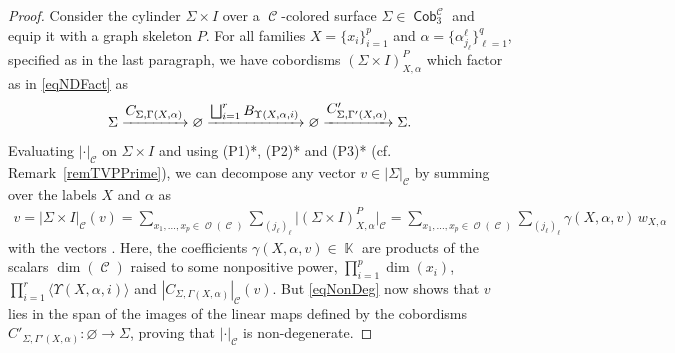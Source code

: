 \documentclass[pdftex]{sigma}
\DeclareMathOperator{\K}{\mathbb{K}}
\DeclareMathOperator{\Cob}{\mathsf{Cob}}
\DeclareMathOperator{\calc}{\mathcal{C}}
\DeclareMathOperator{\calo}{\mathcal{O}}
\numberwithin{equation}{section}
\theoremstyle{definition}
\begin{document}
\begin{proof}
 Consider the cylinder $\Sigma \times I$ over a $\calc$-colored surface $\Sigma \in \Cob_3^{\calc}$ and equip it with a graph skeleton $P$.
 For all families $X = \{x_i\}_{i = 1}^p$ and $\alpha = \{\alpha_{j_{\ell}}^{\ell}\}_{\ell = 1}^q$, specified as in the last paragraph, we have cobordisms $(\Sigma \times I)_{X, \alpha}^P$ which factor as in \eqref{eqNDFact} as
 \begin{align*}
 \Sigma \xrightarrow{\mbox{\normalsize$C_{\Sigma, \Gamma(X, \alpha)}$}} \varnothing \xrightarrow{\mbox{\normalsize$\bigsqcup_{i = 1}^rB_{\Upsilon(X, \alpha, i)}$}} \varnothing \xrightarrow{\mbox{\normalsize$C'_{\Sigma, \Gamma'(X, \alpha)}$}} \Sigma.
 \end{align*}
 Evaluating $|\cdot|_{\calc}$ on $\Sigma \times I$ and using (P1)*, (P2)* and (P3)* (cf. Remark~\ref{remTVPPrime}), we can decompose any vector $v \in |\Sigma|_{\calc}$ by summing over the labels $X$ and $\alpha$ as
 \begin{align}
 \label{eqNonDeg}
 v = |\Sigma \times I|_{\calc}(v) = \sum_{x_1, \dots, x_p \in \calo(\calc)} \sum_{(j_{\ell})_{\ell}}\bigl|(\Sigma \times I)_{X, \alpha}^P\bigr|_{\calc} = \sum_{x_1, \dots, x_p \in \calo(\calc)} \sum_{(j_{\ell})_{\ell}} \gamma(X, \alpha, v)\,w_{X, \alpha}
 \end{align}
 with the vectors \smash{$w_{X, \alpha} = |C'_{\Sigma, \Gamma'(X, \alpha)}|_{\calc}(1) \in |\Sigma|_{\calc}$}. Here, the coefficients $\gamma(X, \alpha, v) \in \K$ are products of the scalars $\dim(\calc)$ raised to some nonpositive power, $\prod_{i = 1}^p\dim(x_i)$, $\prod_{i = 1}^r\langle\Upsilon(X, \alpha, i)\rangle $ and $|C_{\Sigma, \Gamma(X, \alpha)}|_{\calc}(v)$. But \eqref{eqNonDeg} now shows that $v$ lies in the span of the images of the linear maps defined by the cobordisms $C'_{\Sigma, \Gamma'(X, \alpha)}\colon \varnothing \rightarrow \Sigma$, proving that $|\cdot|_{\calc}$ is non-degenerate.
\end{proof}
\end{document}
